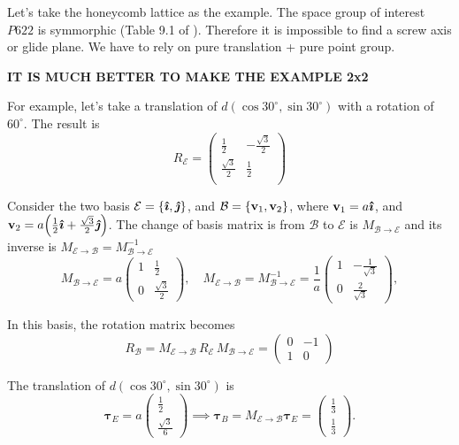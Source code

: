 Let's take the honeycomb lattice as the example. The space group of interest $P622$ \cite{thesis_rennella} is symmorphic (Table 9.1 of \cite{dresselhaus}). Therefore it is impossible to find a screw axis or glide plane. We have to rely on pure translation + pure point group.

\textbf{IT IS MUCH BETTER TO MAKE THE EXAMPLE 2x2}

For example, let's take a translation of $d(\cos30^\circ, \sin30^\circ)$ with a rotation of $60^\circ$. The result is
$$
R_{\mathcal{E}} =
\begin{pmatrix}
\frac{1}{2} & -\frac{\sqrt{3}}{2} \\
\frac{\sqrt{3}}{2} & \frac{1}{2} \\
\end{pmatrix}
$$

Consider the two basis $\mathcal{E} = \{\bm{\hat{\imath}}, \bm{\hat{\jmath}}\}$, and $\mathcal{B} = \{{\vb{v}}_1, {\vb{v}}_2\}$, where ${\vb{v}}_1 = a \bm{\hat{\imath}}$, and ${\vb{v}}_2 = a \qty(\frac{1}{2}\bm{\hat{\imath}} + \frac{\sqrt{3}}{2} \bm{\hat{\jmath}})$. The change of basis matrix is from $\mathcal{B}$ to $\mathcal{E}$ is $M_{\mathcal{B}\to\mathcal{E}}$ and its inverse is $M_{\mathcal{E}\to\mathcal{B}} = M_{\mathcal{B}\to\mathcal{E}}^{-1}$
$$
M_{\mathcal{B} \to \mathcal{E}} =
a
\begin{pmatrix}
1 & \frac{1}{2} \\
0 & \frac{\sqrt{3}}{2}
\end{pmatrix},
\quad
M_{\mathcal{E} \to \mathcal{B}} = M_{\mathcal{B}\to\mathcal{E}}^{-1} =
\frac{1}{a}
\begin{pmatrix}
1 & -\frac{1}{\sqrt{3}} \\
0 & \frac{2}{\sqrt{3}}
\end{pmatrix},
$$

In this basis, the rotation matrix becomes
$$
R_{\mathcal{B}} =  M_{\mathcal{E} \to \mathcal{B}} \, R_{\mathcal{E}} \, M_{\mathcal{B}\to\mathcal{E}} =
\begin{pmatrix}
0 & -1 \\
1 &  0
\end{pmatrix}
$$

The translation of $d(\cos 30^\circ, \sin 30^\circ)$ is
$$
\bm{\tau}_E = a \begin{pmatrix} \frac{1}{2} \\ \frac{\sqrt{3}}{6} \end{pmatrix} \implies
\bm{\tau}_B = M_{\mathcal{E} \to \mathcal{B}} \bm{\tau}_E =
\begin{pmatrix}
\frac{1}{3} \\ \frac{1}{3}
\end{pmatrix}.
$$

